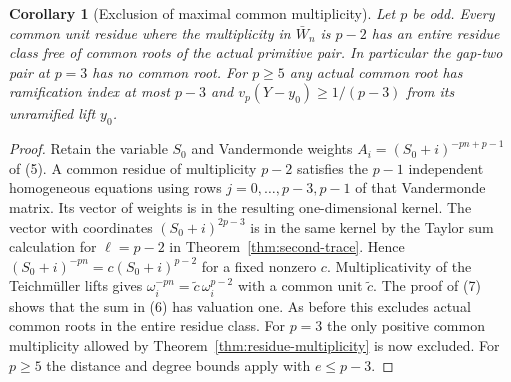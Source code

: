 \documentclass[11pt]{article}
\newtheorem{corollary}[theorem]{Corollary}
\begin{document}
\begin{corollary}[Exclusion of maximal common multiplicity]
\label{cor:maximal}
Let $p$ be odd. Every common unit residue where the multiplicity
in $\bar W_n$ is $p-2$ has an entire residue class free of
common roots of the actual primitive pair.
In particular the gap-two pair at $p=3$ has no common root.
For $p\ge5$ any actual common root has ramification index at
most $p-3$ and $v_p(Y-y_0)\ge1/(p-3)$ from its unramified lift $y_0$.
\end{corollary}
\begin{proof}
Retain the variable $S_0$ and Vandermonde weights
$A_i=(S_0+i)^{-pn+p-1}$ of (5).
A common residue of multiplicity $p-2$ satisfies the
$p-1$ independent homogeneous equations using rows
$j=0,\ldots,p-3,p-1$ of that Vandermonde matrix.
Its vector of weights is in the resulting one-dimensional kernel.
The vector with coordinates $(S_0+i)^{2p-3}$ is in the same
kernel by the Taylor sum calculation for $\ell=p-2$
in Theorem~\ref{thm:second-trace}.
Hence $(S_0+i)^{-pn}=c(S_0+i)^{p-2}$ for a fixed nonzero $c$.
Multiplicativity of the Teichm\"uller lifts gives
$\omega_i^{-pn}=\widetilde c\,\omega_i^{p-2}$ with a common
unit $\widetilde c$.
The proof of (7) shows that the sum in (6) has valuation one.
As before this excludes actual common roots in the entire
residue class. For $p=3$ the only positive common multiplicity
allowed by Theorem~\ref{thm:residue-multiplicity} is now excluded.
For $p\ge5$ the distance and degree bounds apply with $e\le p-3$.
\end{proof}
\end{document}
